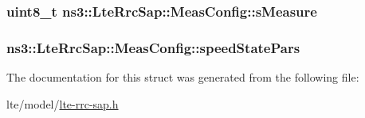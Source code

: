\subsubsection[{\texorpdfstring{s\+Measure}{sMeasure}}]{\setlength{\rightskip}{0pt plus 5cm}uint8\+\_\+t ns3\+::\+Lte\+Rrc\+Sap\+::\+Meas\+Config\+::s\+Measure}\hypertarget{structns3_1_1LteRrcSap_1_1MeasConfig_a069a243a34330262a0c0ec6818d07965}{}\label{structns3_1_1LteRrcSap_1_1MeasConfig_a069a243a34330262a0c0ec6818d07965}
\subsubsection[{\texorpdfstring{speed\+State\+Pars}{speedStatePars}}]{ ns3\+::\+Lte\+Rrc\+Sap\+::\+Meas\+Config\+::speed\+State\+Pars}\hypertarget{structns3_1_1LteRrcSap_1_1MeasConfig_a7ed0531b9220a0404bb928f867baa049}{}\label{structns3_1_1LteRrcSap_1_1MeasConfig_a7ed0531b9220a0404bb928f867baa049}


The documentation for this struct was generated from the following file\+:\begin{DoxyCompactItemize}
\item 
lte/model/\hyperlink{lte-rrc-sap_8h}{lte-\/rrc-\/sap.\+h}\end{DoxyCompactItemize}
